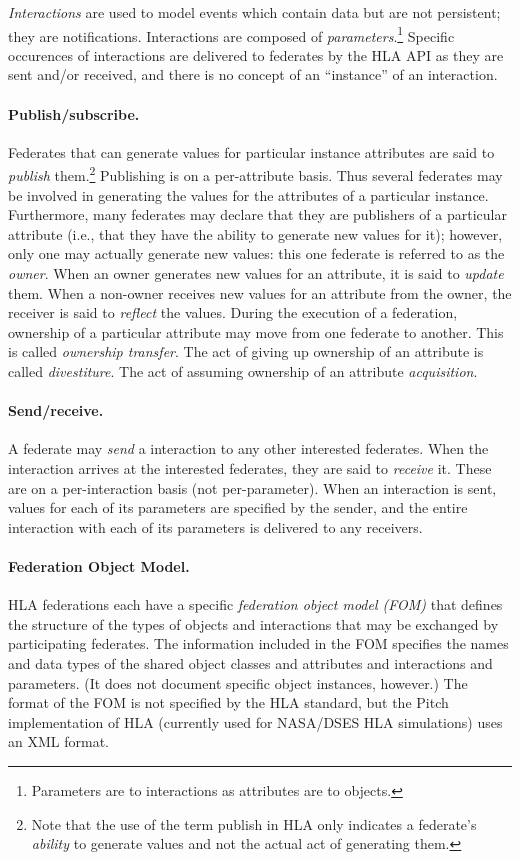 {\em Interactions} are used to model events which contain data but are
not persistent; they are notifications.
Interactions are composed of {\em parameters}.\footnote{
  Parameters are to interactions as attributes are to objects.
}
Specific occurences of interactions are delivered to federates by the
HLA API as they are sent and/or received, and there is no concept of
an ``instance'' of an interaction.

\paragraph{Publish/subscribe.}
Federates that can generate values for particular instance attributes
are said to {\em publish} them.\footnote{
  Note that the use of the term publish in HLA only indicates a
  federate's {\em ability} to generate values and not the actual act of
  generating them.
}
Publishing is on a per-attribute basis.
Thus several federates may be involved in generating the values for
the attributes of a particular instance.
Furthermore, many federates may declare that they are publishers of a
particular attribute (i.e., that they have the ability to generate new
values for it); however, only one may actually generate new values:
this one federate is referred to as the {\em owner}.
When an owner generates new values for an attribute, it is said to
{\em update} them.
When a non-owner receives new values for an attribute from the owner,
the receiver is said to {\em reflect} the values.
During the execution of a federation,
ownership of a particular attribute may move from one federate to another.
This is called {\em ownership transfer}.
The act of giving up ownership of an attribute is called {\em divestiture}.
The act of assuming ownership of an attribute {\em acquisition}.

\paragraph{Send/receive.}
A federate may {\em send} a interaction to any other interested federates.
When the interaction arrives at the interested federates, they are said
to {\em receive} it.
These are on a per-interaction basis (not per-parameter).
When an interaction is sent, values for each of its parameters are
specified by the sender, and the entire interaction with each of its
parameters is delivered to any receivers.

\paragraph{Federation Object Model.}
HLA federations each have a specific {\em federation object model (FOM)}
that defines the structure of the types of objects and interactions
that may be exchanged by participating federates.
The information included in the FOM specifies the names and data types
of the shared object classes and attributes and interactions and parameters.
(It does not document specific object instances, however.)
The format of the FOM is not specified by the HLA standard, but the
Pitch implementation of HLA
(currently used for NASA/DSES HLA simulations)
uses an XML format.

